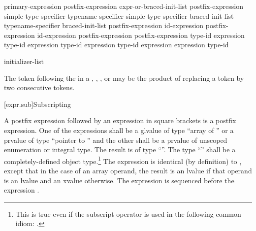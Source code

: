 \begin{bnf}
\br
    primary-expression\br
    postfix-expression \terminal{[} expr-or-braced-init-list \terminal{]}\br
    postfix-expression \terminal{(}  \terminal{)}\br
    simple-type-specifier \terminal{(}  \terminal{)}\br
    typename-specifier \terminal{(}  \terminal{)}\br
    simple-type-specifier braced-init-list\br
    typename-specifier braced-init-list\br
    postfix-expression  id-expression\br
    postfix-expression  id-expression\br
    postfix-expression \terminal{++}\br
    postfix-expression \terminal{-{-}}\br
     \terminal{<} type-id \terminal{>} \terminal{(} expression \terminal{)}\br
     \terminal{<} type-id \terminal{>} \terminal{(} expression \terminal{)}\br
     \terminal{<} type-id \terminal{>} \terminal{(} expression \terminal{)}\br
     \terminal{<} type-id \terminal{>} \terminal{(} expression \terminal{)}\br
     \terminal{(} expression \terminal{)}\br
     \terminal{(} type-id \terminal{)}
\end{bnf}

\begin{bnf}
\br
    initializer-list
\end{bnf}

\pnum
\begin{note}
The \tcode{>} token following the
 in a ,
, , or
 may be the product of replacing a
\tcode{>{>}} token by two consecutive \tcode{>}
tokens.
\end{note}

[expr.sub]{Subscripting}

\pnum
{}%
%
A postfix expression followed by an expression in square brackets is a
postfix expression. One of the expressions shall be a glvalue of type ``array of
'' or a prvalue of type ``pointer
to '' and the other shall be a prvalue of unscoped enumeration or integral type.
The result is of type ``''.
%
The type ``'' shall be a completely-defined object type.\footnote{This
is true even if the subscript operator is used in the following common idiom:
.}
The expression  is identical (by definition) to
,
except that in the case of an array operand, the result is an lvalue
if that operand is an lvalue and an xvalue otherwise.
The expression  is sequenced before the expression .

